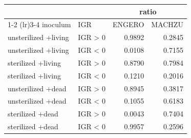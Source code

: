 \begin{table}[t]
\fontsize{12.0pt}{14.4pt}\selectfont
\begin{tabular*}{\linewidth}{@{\extracolsep{\fill}}llrr}
\toprule
\multicolumn{2}{c}{  } & \multicolumn{2}{c}{ratio} \\ 
\cmidrule(lr){1-2} \cmidrule(lr){3-4}
inoculum & IGR & ENGERO & MACHZU \\ 
\midrule\addlinespace[2.5pt]
unsterilized
+living & IGR > 0 & 0.9892 & 0.2845 \\ 
unsterilized
+living & IGR < 0 & 0.0108 & 0.7155 \\ 
sterilized
+living & IGR > 0 & 0.8790 & 0.7984 \\ 
sterilized
+living & IGR < 0 & 0.1210 & 0.2016 \\ 
unsterilized
+dead & IGR > 0 & 0.8945 & 0.3817 \\ 
unsterilized
+dead & IGR < 0 & 0.1055 & 0.6183 \\ 
sterilized
+dead & IGR > 0 & 0.0043 & 0.7404 \\ 
sterilized
+dead & IGR < 0 & 0.9957 & 0.2596 \\ 
\bottomrule
\end{tabular*}
\end{table}


